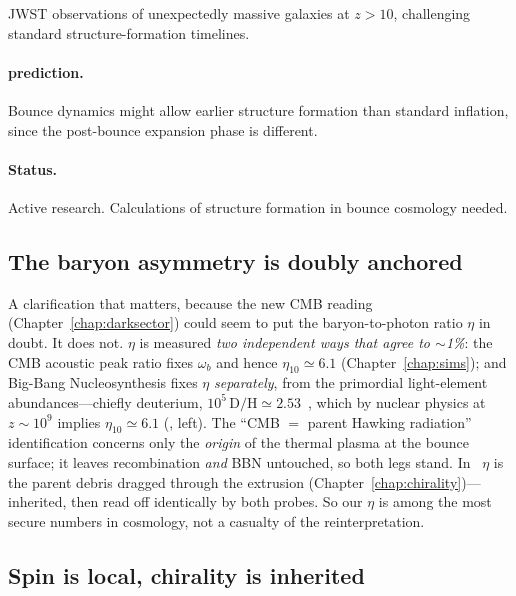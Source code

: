JWST observations of unexpectedly massive galaxies at $z > 10$, challenging
standard structure-formation timelines.
\paragraph{\SCT prediction.} Bounce dynamics might allow earlier structure
formation than standard inflation, since the post-bounce expansion phase is
different.
\paragraph{Status.} Active research. Calculations of structure formation in
bounce cosmology needed.

\subsection{The baryon asymmetry is doubly anchored}
\label{sec:eta-anchored}

A clarification that matters, because the new CMB reading
(Chapter~\ref{chap:darksector}) could seem to put the baryon-to-photon ratio
$\eta$ in doubt. It does not. $\eta$ is measured \emph{two independent ways that
agree to $\sim$1\%}: the CMB acoustic peak ratio fixes $\omega_b$ and hence $\eta_{10}
\simeq6.1$ (Chapter~\ref{chap:sims}); and Big-Bang Nucleosynthesis fixes $\eta$
\emph{separately}, from the primordial light-element abundances---chiefly deuterium,
$10^5\,\mathrm{D/H}\simeq2.53$~\citep{cooke2018}, which by nuclear physics at
$z\sim10^9$ implies $\eta_{10}\simeq6.1$ (, left). The
``CMB $=$ parent Hawking radiation'' identification concerns only the \emph{origin}
of the thermal plasma at the bounce surface; it leaves recombination \emph{and} BBN
untouched, so both legs stand. In \SCT\ $\eta$ is the parent debris dragged through
the extrusion (Chapter~\ref{chap:chirality})---inherited, then read off identically
by both probes. So our $\eta$ is among the most secure numbers in cosmology, not a
casualty of the reinterpretation.

\subsection{Spin is local, chirality is inherited}
\label{sec:spin-local}

